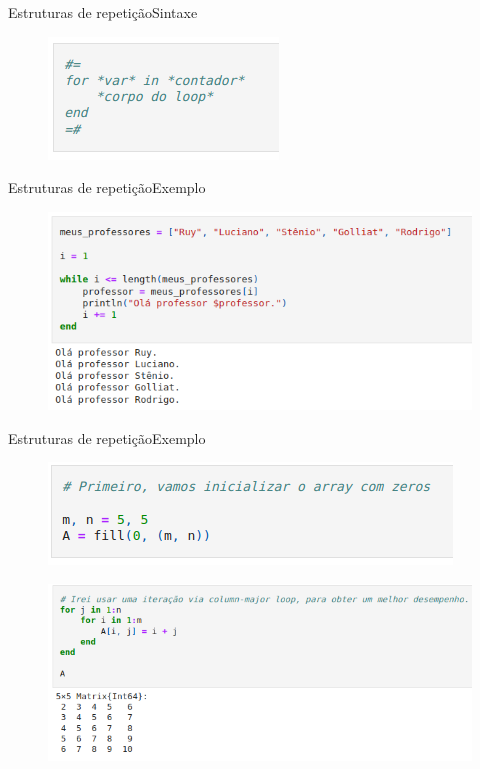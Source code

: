 \documentclass{beamer}
\begin{document}
\begin{frame}{Estruturas de repetição}{Sintaxe}
    \begin{figure}
        \centering
        \includegraphics[scale=0.6]{imagens/for.png}
        \label{fig:my_label}
    \end{figure}
\end{frame}

\begin{frame}{Estruturas de repetição}{Exemplo}
    \begin{figure}
        \centering
        \includegraphics[scale=0.4]{imagens/ex-while.png}
        \label{fig:my_label}
    \end{figure}
\end{frame}

\begin{frame}{Estruturas de repetição}{Exemplo}
    \begin{figure}
        \centering
        \includegraphics[scale=0.4]{imagens/matriz-zerada.png}
        \label{fig:my_label}
    \end{figure}
    \begin{figure}
        \centering
        \includegraphics[scale=0.4]{imagens/ex-for.png}
        \label{fig:my_label}
    \end{figure}
\end{frame}
\end{document}
